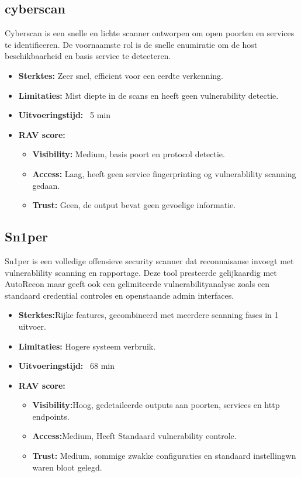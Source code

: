 \subsection{cyberscan}

Cyberscan is een snelle en lichte scanner ontworpen om open poorten en services te identificeren. 
De voornaamste rol is de snelle enumiratie om de host beschikbaarheid en basis service te detecteren.

\begin{itemize}
  \item \textbf{Sterktes:} Zeer snel, efficient voor een eerdte verkenning.
  \item \textbf{Limitaties:} Mist diepte in de scans en heeft geen vulnerability detectie.
  \item \textbf{Uitvoeringstijd:} ~5 min
  \item \textbf{RAV score:}
    \small{
    \begin{itemize}
      \item \textbf{Visibility:} Medium, basis poort en protocol detectie.
      \item \textbf{Access:} Laag, heeft geen service fingerprinting og vulnerablility scanning gedaan.
      \item \textbf{Trust:} Geen, de output bevat geen gevoelige informatie. 
    \end{itemize}
    }
\end{itemize}

\subsection{Sn1per}
Sn1per is een volledige offensieve security scanner dat reconnaisanse invoegt met vulnerablility scanning en rapportage. 
Deze tool presteerde gelijkaardig met AutoRecon maar geeft ook een gelimiteerde vulnerabilityanalyse zoals een standaard credential controles en openstaande admin interfaces.

\begin{itemize}
  \item \textbf{Sterktes:}Rijke features, gecombineerd met meerdere scanning fases in 1 uitvoer.
  \item \textbf{Limitaties:} Hogere systeem verbruik.
  \item \textbf{Uitvoeringstijd:} ~68 min
  \item \textbf{RAV score:}
    \small{
    \begin{itemize}
      \item \textbf{Visibility:}Hoog, gedetaileerde outputs aan poorten, services en http endpoints.
      \item \textbf{Access:}Medium, Heeft Standaard vulnerability controle.
      \item \textbf{Trust:} Medium, sommige zwakke configuraties en standaard instellingwn waren bloot gelegd.
    \end{itemize}
    }
\end{itemize}


